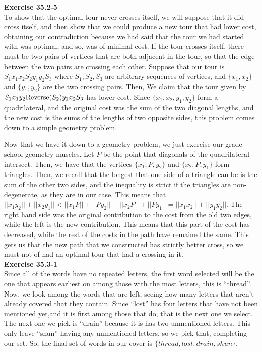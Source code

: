 \documentclass{article}
\begin{document}
\noindent\textbf{Exercise 35.2-5}\\

To show that the optimal tour never crosses itself, we will suppose that it did cross itself, and then show that we could produce a new tour that had lower cost, obtaining our contradiction because we had said that the tour we had started with was optimal, and so, was of minimal cost. If the tour crosses itself, there must be two pairs of vertices that are both adjacent in the tour, so that the edge between the two pairs are crossing each other. Suppose that our tour is $S_1x_1 x_2 S_2 y_1 y_2 S_3$ where $S_1,S_2,S_3$ are arbitrary sequences of vertices, and $\{x_1,x_2\}$ and $\{y_1,y_2\}$ are the two crossing pairs. Then, We claim that the tour given by $S_1 x_1 y_2 \hbox{Reverse}(S_2) y_1 x_2 S_3$ has lower cost. Since $\{x_1,x_2,y_1,y_2\}$ form a quadrilateral, and the original cost was the sum of the two diagonal lengths, and the new cost is the sums of the lengths of two opposite sides, this problem comes down to a simple geometry problem.

Now that we have it down to a geometry problem, we just exercise our grade school geometry muscles. Let $P$ be the point that diagonals of the quadrilateral intersect. Then, we have that the vertices $\{x_1,P,y_2\}$ and $\{x_2,P,y_1\}$ form triangles. Then, we recall that the longest that one side of a triangle can be is the sum of the other two sides, and the inequality is strict if the triangles are non-degenerate, as  they are in our case. This means that $||x_1y_2|| + ||x_2y_1|| < ||x_1P|| +||Py_2|| + ||x_2P|| + ||Py_1|| = ||x_1x_2|| + ||y_1y_2||$. The right hand side was the original contribution to the cost from the old two edges, while the left is the new contribution. This means that this part of the cost has decreased, while the rest of the costs in the path have remained the same. This gets us that the new path that we constructed has strictly better cross, so we must not of had an optimal tour that had a crossing in it.\\



\noindent\textbf{Exercise 35.3-1}\\

Since all of the words have no repeated letters, the first word selected will be the one that appears earliest on among those with the most letters, this is ``thread''. Now, we look among the words that are left, seeing how many letters that aren't already covered that they contain. Since ``lost'' has four letters that have not been mentioned yet,and it is first among those that do, that is the next one we select. The next one we pick is ``drain'' because it is has two unmentioned letters. This only leave ``shun'' having any unmentioned letters, so we pick that, completing our set. So, the final set of words in our cover is $\{thread,lost,drain,shun\}$.\\
\end{document}
